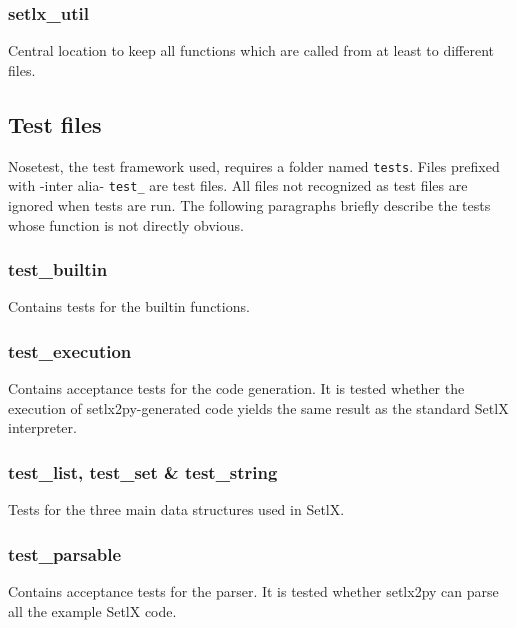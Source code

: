 %
\subsubsection{setlx\_util}

Central location to keep all functions which are called from at least to different files.

%
%
\clearpage
\subsection{Test files}

Nosetest, the test framework used, requires a folder named \texttt{tests}. Files prefixed with -inter alia- \texttt{test\_} are  test files. All files not recognized as test files are ignored when tests are run. The following paragraphs briefly describe the tests whose function is not directly obvious.

%
\subsubsection{test\_builtin}

Contains tests for the builtin functions.

%
\subsubsection{test\_execution}

Contains acceptance tests for the code generation. It is tested whether the execution of setlx2py-generated code yields the same result as the standard SetlX interpreter.
%
\subsubsection{test\_list, test\_set \& test\_string }

Tests for the three main data structures used in SetlX.

%
\subsubsection{test\_parsable}

Contains acceptance tests for the parser. It is tested whether setlx2py can parse all the example SetlX code.